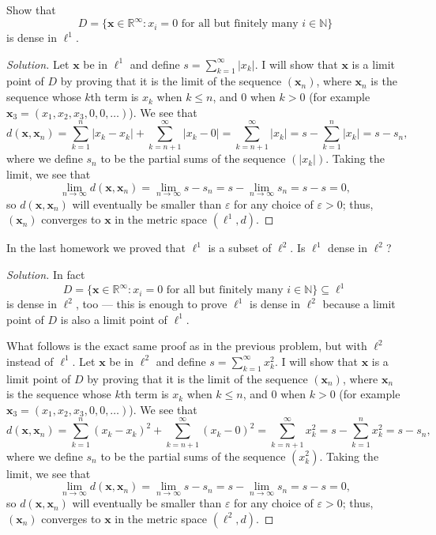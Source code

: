 \documentclass[11pt]{scrartcl}
\providecommand{\eps}{\varepsilon}
\providecommand{\NN}{\mathbb N}
\providecommand{\RR}{\mathbb R}
\providecommand{\mb}[1]{\mathbf{#1}}
\newenvironment{soln}{\begin{proof}[Solution]}{\end{proof}}
\begin{document}
\begin{problem}
	Show that
	\[D = \{\mb x\in\RR^\infty :
	x_i = 0\text{ for all but finitely many } i\in\NN\}\]
	is dense in $\ell^1$.
\end{problem}

\begin{soln}
	Let $\mb x$ be in $\ell^1$ and define $s = \sum_{k=1}^\infty |x_k|$.
	I will show that $\mb x$ is a limit point of $D$
	by proving that it is the limit of the sequence $(\mb x_n)$,
	where $\mb x_n$ is the sequence whose $k$th term is $x_k$
	when $k\le n$, and $0$ when $k > 0$
	(for example $\mb x_3 = (x_1, x_2, x_3, 0, 0, \dots)$).
	We see that
	\[d(\mb x, \mb x_n) = \sum_{k=1}^n |x_k - x_k| +
	\sum_{k=n+1}^\infty |x_k - 0| = \sum_{k=n+1}^\infty |x_k| =
	s - \sum_{k=1}^n |x_k| = s - s_n,\]
	where we define $s_n$ to be the partial sums of the sequence $(|x_k|)$.
	Taking the limit, we see that
	\[\lim_{n\to\infty} d(\mb x, \mb x_n) =
	\lim_{n\to\infty} s - s_n = s - \lim_{n\to\infty} s_n = s - s = 0,\]
	so $d(\mb x, \mb x_n)$ will eventually be smaller than $\eps$
	for any choice of $\eps > 0$; thus, $(\mb x_n)$ converges to $\mb x$
	in the metric space $(\ell^1, d)$.
\end{soln}

\begin{problem}
	In the last homework we proved that $\ell^1$ is a subset of $\ell^2$.
	Is $\ell^1$ dense in $\ell^2$?
\end{problem}

\begin{soln}
	In fact
	\[D = \{\mb x\in\RR^\infty :
	x_i = 0\text{ for all but finitely many } i\in\NN\}\subseteq \ell^1\]
	is dense in $\ell^2$, too --- this is enough to prove
	$\ell^1$ is dense in $\ell^2$ because a limit point of $D$
	is also a limit point of $\ell^1$.
	
	What follows is the exact same proof as in the previous problem,
	but with $\ell^2$ instead of $\ell^1$.
	Let $\mb x$ be in $\ell^2$ and define $s = \sum_{k=1}^\infty x_k^2$.
	I will show that $\mb x$ is a limit point of $D$
	by proving that it is the limit of the sequence $(\mb x_n)$,
	where $\mb x_n$ is the sequence whose $k$th term is $x_k$
	when $k\le n$, and $0$ when $k > 0$
	(for example $\mb x_3 = (x_1, x_2, x_3, 0, 0, \dots)$).
	We see that
	\[d(\mb x, \mb x_n) = \sum_{k=1}^n (x_k - x_k)^2 +
	\sum_{k=n+1}^\infty (x_k - 0)^2 = \sum_{k=n+1}^\infty x_k^2 =
	s - \sum_{k=1}^n x_k^2 = s - s_n,\]
	where we define $s_n$ to be the partial sums of the sequence $(x_k^2)$.
	Taking the limit, we see that
	\[\lim_{n\to\infty} d(\mb x, \mb x_n) =
	\lim_{n\to\infty} s - s_n = s - \lim_{n\to\infty} s_n = s - s = 0,\]
	so $d(\mb x, \mb x_n)$ will eventually be smaller than $\eps$
	for any choice of $\eps > 0$; thus, $(\mb x_n)$ converges to $\mb x$
	in the metric space $(\ell^2, d)$.
\end{soln}
\end{document}
